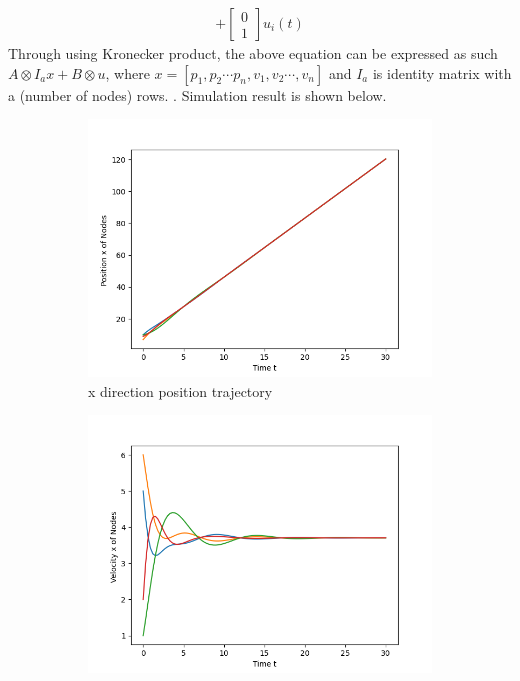 \documentclass{article}
\begin{document}
\begin{problem}
\begin{align*}
        + 
        \begin{bmatrix*}
            0\\
            1
        \end{bmatrix*} u_i(t)
    \end{align*}
    Through using Kronecker product, the above equation can be expressed as such $ A \otimes I_{a} x + B \otimes u $, where $x = [p_1, p_2 \cdots p_n, v_1, v_2 \cdots, v_n]$ and $I_{a}$ is identity matrix with a (number of nodes) rows. . Simulation result is shown below. 
    \newpage
    \begin{figure}[!h]
        \centering
        \begin{subfigure}{0.35\textwidth}
            \includegraphics[width=\textwidth]{./img/p1_1.png}
            \caption{x direction position trajectory}
        \end{subfigure}
        \begin{subfigure}{0.35\textwidth}
            \includegraphics[width=\textwidth]{./img/p1_2.png}

\end{subfigure}
\end{figure}
\end{problem}
\end{document}
